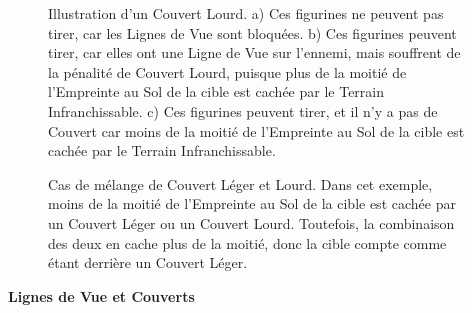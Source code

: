 \newcommand{\figureHCImpassableTerrain}{\normalfontsize{Terrain Infranchissable}}

\begin{figure}[!htbp]
\centering
\def\svgwidth{\textwidth}

\caption{Illustration d'un Couvert Lourd.\vspace*{10pt}\newline
a) Ces figurines ne peuvent pas tirer, car les Lignes de Vue sont bloquées.\vspace*{10pt}\newline
b) Ces figurines peuvent tirer, car elles ont une Ligne de Vue sur l'ennemi, mais souffrent de la pénalité de Couvert Lourd, puisque plus de la moitié de l'Empreinte au Sol de la cible est cachée par le Terrain Infranchissable.\vspace*{10pt}\newline
c) Ces figurines peuvent tirer, et il n'y a pas de Couvert car moins de la moitié de l'Empreinte au Sol de la cible est cachée par le Terrain Infranchissable.}
\label{figure/hard_cover}
\end{figure}

\newcommand{\figureSHCHill}{Colline}
\newcommand{\figureSHCHeightOne}{Taille 1}
\newcommand{\figureSHCHeightTwo}{Taille 2}
\newcommand{\figureSHCLessthanhalffromhardcover}{\normalfontsize{\textit{Moins de 50 \% en Couvert Lourd}}}
\newcommand{\figureSHCLessthanhalffromsoftcover}{\normalfontsize{\textit{Moins de 50 \% en Couvert Léger}}}
\newcommand{\figureSHCMorethanhalftotal}{\normalfontsize{\textit{Plus de 50 \% en tout}}}

\begin{figure}[!htbp]
\begin{minipage}[t]{0.45\textwidth}
\def\svgwidth{\textwidth}

\end{minipage}\hfill\begin{minipage}[b]{0.52\textwidth}
\caption{Cas de mélange de Couvert Léger et Lourd.\vspace*{10pt}\newline
Dans cet exemple, moins de la moitié de l'Empreinte au Sol de la cible est cachée par un Couvert Léger ou un Couvert Lourd. Toutefois, la combinaison des deux en cache plus de la moitié, donc la cible compte comme étant derrière un Couvert Léger.}
\label{figure/soft_and_hard_cover}
\end{minipage}
\end{figure}

\clearpage
\noindent\textbf{Lignes de Vue et Couverts}

